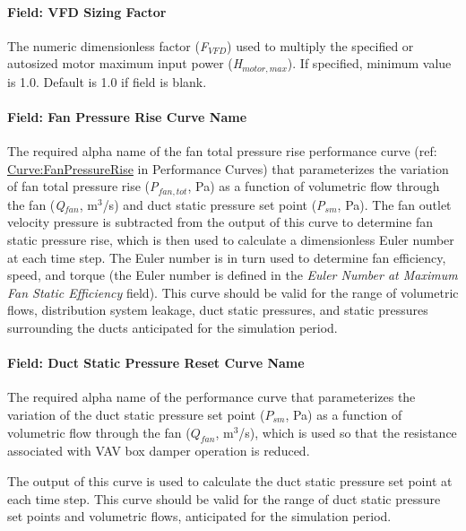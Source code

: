 \paragraph{Field: VFD Sizing Factor}\label{field-vfd-sizing-factor}

The numeric dimensionless factor (\emph{F\(_{VFD}\)}) used to multiply the specified or autosized motor maximum input power (\emph{H\(_{motor,max}\)}). If specified, minimum value is 1.0. Default is 1.0 if field is blank.

\paragraph{Field: Fan Pressure Rise Curve Name}\label{field-fan-pressure-rise-curve-name}

The required alpha name of the fan total pressure rise performance curve (ref: \hyperref[curvefanpressurerise]{Curve:FanPressureRise} in Performance Curves) that parameterizes the variation of fan total pressure rise (\emph{P\(_{fan,tot}\)}, Pa) as a function of volumetric flow through the fan (\emph{Q\(_{fan}\)}, m\(^{3}\)/s) and duct static pressure set point (\emph{P\(_{sm}\)}, Pa). The fan outlet velocity pressure is subtracted from the output of this curve to determine fan static pressure rise, which is then used to calculate a dimensionless Euler number at each time step. The Euler number is in turn used to determine fan efficiency, speed, and torque (the Euler number is defined in the \emph{Euler Number at Maximum Fan Static Efficiency} field). This curve should be valid for the range of volumetric flows, distribution system leakage, duct static pressures, and static pressures surrounding the ducts anticipated for the simulation period.

\paragraph{Field: Duct Static Pressure Reset Curve Name}\label{field-duct-static-pressure-reset-curve-name}

The required alpha name of the performance curve that parameterizes the variation of the duct static pressure set point (\(P_{sm}\), Pa) as a function of volumetric flow through the fan (\(Q_{fan}\), m\(^{3}\)/s), which is used so that the resistance associated with VAV box damper operation is reduced.

The output of this curve is used to calculate the duct static pressure set point at each time step. This curve should be valid for the range of duct static pressure set points and volumetric flows, anticipated for the simulation period.


